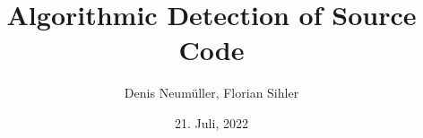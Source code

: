 \documentclass[a3paper, protrait, ngerman]{uulm-cs-poster}
\title{Algorithmic Detection of Source Code}
\author{Denis Neumüller, Florian Sihler}
\date{21. Juli, 2022}
\begin{document}
\maketitle
\lipsum
\end{document}
